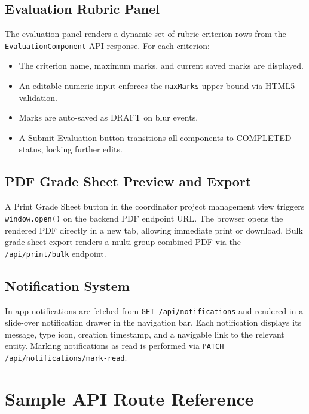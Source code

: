 \subsection{Evaluation Rubric Panel}
The evaluation panel renders a dynamic set of rubric criterion rows from the \texttt{EvaluationComponent} API response. For each criterion:
\begin{itemize}
    \item The criterion name, maximum marks, and current saved marks are displayed.
    \item An editable numeric input enforces the \texttt{maxMarks} upper bound via HTML5 validation.
    \item Marks are auto-saved as DRAFT on blur events.
    \item A Submit Evaluation button transitions all components to COMPLETED status, locking further edits.
\end{itemize}

\subsection{PDF Grade Sheet Preview and Export}
A Print Grade Sheet button in the coordinator project management view triggers \texttt{window.open()} on the backend PDF endpoint URL. The browser opens the rendered PDF directly in a new tab, allowing immediate print or download. Bulk grade sheet export renders a multi-group combined PDF via the \texttt{/api/print/bulk} endpoint.

\subsection{Notification System}
In-app notifications are fetched from \texttt{GET /api/notifications} and rendered in a slide-over notification drawer in the navigation bar. Each notification displays its message, type icon, creation timestamp, and a navigable link to the relevant entity. Marking notifications as read is performed via \texttt{PATCH /api/notifications/mark-read}.

\section{Sample API Route Reference}

